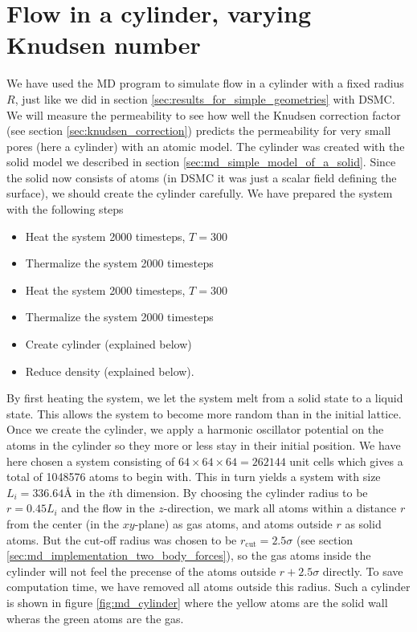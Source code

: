 \section{Flow in a cylinder, varying Knudsen number}
\label{sec:md_cylinder_result}
We have used the MD program to simulate flow in a cylinder with a fixed radius $R$, just like we did in section \ref{sec:results_for_simple_geometries} with DSMC. We will measure the permeability to see how well the Knudsen correction factor (see section \ref{sec:knudsen_correction}) predicts the permeability for very small pores (here a cylinder) with an atomic model. The cylinder was created with the solid model we described in section \ref{sec:md_simple_model_of_a_solid}. Since the solid now consists of atoms (in DSMC it was just a scalar field defining the surface), we should create the cylinder carefully. We have prepared the system with the following steps
\begin{itemize}
	\item Heat the system 2000 timesteps, $T=$\unit{300}{\kelvin}
	\item Thermalize the system 2000 timesteps
	\item Heat the system 2000 timesteps, $T=$\unit{300}{\kelvin}
	\item Thermalize the system 2000 timesteps
	\item Create cylinder (explained below)
	\item Reduce density (explained below).
\end{itemize}
By first heating the system, we let the system melt from a solid state to a liquid state. This allows the system to become more random than in the initial lattice. Once we create the cylinder, we apply a harmonic oscillator potential on the atoms in the cylinder so they more or less stay in their initial position. We have here chosen a system consisting of $64\times64\times64=262144$ unit cells which gives a total of 1048576 atoms to begin with. This in turn yields a system with size $L_i=336.64Å$ in the $i$th dimension. By choosing the cylinder radius to be $r=0.45L_i$ and the flow in the $z$-direction, we mark all atoms within a distance $r$ from the center (in the $xy$-plane) as gas atoms, and atoms outside $r$ as solid atoms. But the cut-off radius was chosen to be $r_\text{cut}=2.5\sigma$ (see section \ref{sec:md_implementation_two_body_forces}), so the gas atoms inside the cylinder will not feel the precense of the atoms outside $r+2.5\sigma$ directly. To save computation time, we have removed all atoms outside this radius. Such a cylinder is shown in figure \ref{fig:md_cylinder} where the yellow atoms are the solid wall wheras the green atoms are the gas.
